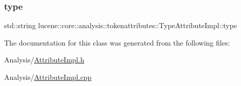 \subsubsection{\texorpdfstring{type}{type}}
{\footnotesize\ttfamily std\+::string lucene\+::core\+::analysis\+::tokenattributes\+::\+Type\+Attribute\+Impl\+::type\hspace{0.3cm}{\ttfamily [private]}}



The documentation for this class was generated from the following files\+:\begin{DoxyCompactItemize}
\item 
Analysis/\mbox{\hyperlink{AttributeImpl_8h}{Attribute\+Impl.\+h}}\item 
Analysis/\mbox{\hyperlink{AttributeImpl_8cpp}{Attribute\+Impl.\+cpp}}\end{DoxyCompactItemize}
